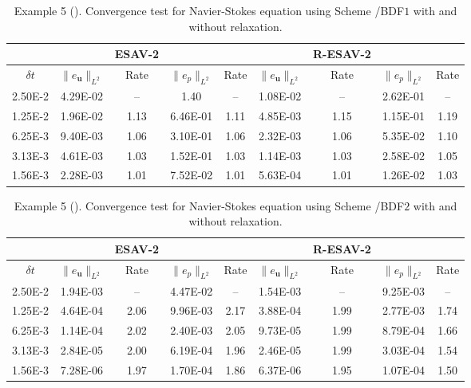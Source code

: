 \documentclass[final,review,onefignum,onetabnum]{siamart190516}
\theoremstyle{plain}
\begin{document}
\linespread{1.2}
\begin{table}[!h] 
	\centering
	\caption{Example 5 (). Convergence test for Navier-Stokes equation using Scheme \uppercase\expandafter{}/BDF$1$ with and without relaxation.}
	 \label{table:NS-scheme1-1st}
	\begin{tabular}{||c||cccc||cccc||}
		\hline
	& & ESAV-2 & & & & R-ESAV-2 & & \\
		\hline
	$\delta t$ & $\|e_{\mathbf{u}}\|_{L^{2}}$ & Rate & $\|e_{p}\|_{L^{2}}$ & Rate & $\|e_{\mathbf{u}}\|_{L^{2}}$ & Rate & $\|e_{p}\|_{L^{2}}$ & Rate\\
		\hline
	2.50E-2  & 4.29E-02 &  --    & 1.40       & --    & 1.08E-02 &  --    & 2.62E-01   & -- \\
	1.25E-2  & 1.96E-02 &  1.13  & 6.46E-01   & 1.11  & 4.85E-03 &  1.15  & 1.15E-01   & 1.19\\
	6.25E-3  & 9.40E-03 &  1.06  & 3.10E-01   & 1.06  & 2.32E-03 &  1.06  & 5.35E-02   & 1.10\\
	3.13E-3  & 4.61E-03 &  1.03  & 1.52E-01   & 1.03  & 1.14E-03 &  1.03  & 2.58E-02   & 1.05\\
	1.56E-3  & 2.28E-03 &  1.01  & 7.52E-02   & 1.01  & 5.63E-04 &  1.01  & 1.26E-02   & 1.03\\
	\hline
	\end{tabular}
\end{table}

 
\linespread{1.2}
\begin{table}[!h] 
	\centering
	\caption{Example 5 (). Convergence test for Navier-Stokes equation using Scheme \uppercase\expandafter{}/BDF$2$ with and without relaxation.}
	 \label{table:NS-scheme1-2nd}
	\begin{tabular}{||c||cccc||cccc||}
		\hline
	& & ESAV-2 & & & & R-ESAV-2 & & \\
		\hline
	$\delta t$ & $\|e_{\mathbf{u}}\|_{L^{2}}$ & Rate & $\|e_{p}\|_{L^{2}}$ & Rate & $\|e_{\mathbf{u}}\|_{L^{2}}$ & Rate & $\|e_{p}\|_{L^{2}}$ & Rate\\
		\hline
	2.50E-2  & 1.94E-03 &  --    & 4.47E-02   & --    & 1.54E-03 &  --    & 9.25E-03   & -- \\
	1.25E-2  & 4.64E-04 &  2.06  & 9.96E-03   & 2.17  & 3.88E-04 &  1.99  & 2.77E-03   & 1.74\\
	6.25E-3  & 1.14E-04 &  2.02  & 2.40E-03   & 2.05  & 9.73E-05 &  1.99  & 8.79E-04   & 1.66\\
	3.13E-3  & 2.84E-05 &  2.00  & 6.19E-04   & 1.96  & 2.46E-05 &  1.99  & 3.03E-04   & 1.54\\
	1.56E-3  & 7.28E-06 &  1.97  & 1.70E-04   & 1.86  & 6.37E-06 &  1.95  & 1.07E-04   & 1.50\\
	\hline
	\end{tabular}
\end{table}
\end{document}
